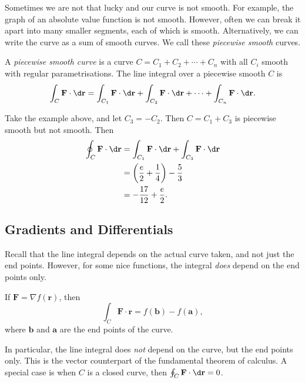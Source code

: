 \documentclass[a4paper]{article}
\begin{document}
Sometimes we are not that lucky and our curve is not smooth. For example, the graph of an absolute value function is not smooth. However, often we can break it apart into many smaller segments, each of which is smooth. Alternatively, we can write the curve as a sum of smooth curves. We call these \emph{piecewise smooth} curves.

\begin{defi}
  A \emph{piecewise smooth curve} is a curve $C = C_1 + C_2 + \cdots + C_n$ with all $C_i$ smooth with regular parametrisations. The line integral over a piecewise smooth $C$ is
  \[
    \int_C \mathbf{F}\cdot \d \mathbf{r} = \int_{C_1} \mathbf{F}\cdot \d \mathbf{r} + \int_{C_2} \mathbf{F}\cdot \d \mathbf{r} + \cdots + \int_{C_n} \mathbf{F}\cdot \d \mathbf{r}.
  \]
\end{defi}

\begin{eg}
  Take the example above, and let $C_3 = -C_2$. Then $C = C_1 + C_3$ is piecewise smooth but not smooth. Then
  \begin{align*}
    \oint _C \mathbf{F}\cdot \d \mathbf{r} &= \int_{C_1} \mathbf{F}\cdot \d \mathbf{r} + \int_{C_3} \mathbf{F}\cdot \d \mathbf{r}\\
    &= \left(\frac{e}{2} + \frac{1}{4}\right) - \frac{5}{3}\\
    &= -\frac{17}{12} + \frac{e}{2}.
  \end{align*}
  \begin{center}
  \end{center}
\end{eg}
\subsection{Gradients and Differentials}
Recall that the line integral depends on the actual curve taken, and not just the end points. However, for some nice functions, the integral \emph{does} depend on the end points only.
\begin{thm}
  If $\mathbf{F} = \nabla f(\mathbf{r})$, then
  \[
    \int _C \mathbf{F}\cdot \mathbf{r} = f(\mathbf{b}) - f(\mathbf{a}),
  \]
  where $\mathbf{b}$ and $\mathbf{a}$ are the end points of the curve.

  In particular, the line integral does \emph{not} depend on the curve, but the end points only. This is the vector counterpart of the fundamental theorem of calculus. A special case is when $C$ is a closed curve, then $\oint_C \mathbf{F}\cdot \d \mathbf{r} = 0$.
\end{thm}
\end{document}
